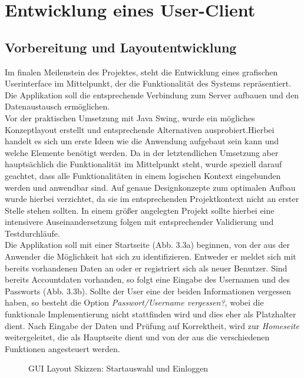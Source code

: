 

\section{Entwicklung eines User-Client}

\subsection{Vorbereitung und Layoutentwicklung}
Im finalen Meilenstein des Projektes, steht die Entwicklung eines grafischen Userinterface im Mittelpunkt, der die Funktionalität des Systems repräsentiert. Die Applikation soll die entsprechende Verbindung zum Server aufbauen und den Datenaustausch ermöglichen. \\

Vor der praktischen Umsetzung mit Java Swing, wurde ein mögliches Konzeptlayout erstellt und entsprechende Alternativen ausprobiert.Hierbei handelt es sich um erste Ideen wie die Anwendung aufgebaut sein kann und welche Elemente benötigt werden.
Da in der letztendlichen Umsetzung aber hauptsächlich die Funktionalität im Mittelpunkt steht, wurde speziell darauf geachtet, dass alle Funktionalitäten in einem logischen Kontext eingebunden werden und anwendbar sind. Auf genaue Designkonzepte zum optimalen Aufbau wurde hierbei verzichtet, da sie im entsprechenden Projektkontext nicht an erster Stelle stehen sollten. In einem größer angelegten Projekt sollte hierbei eine intensivere Auseinandersetzung folgen mit entsprechender Validierung und Testdurchläufe. \\

Die Applikation soll mit einer Startseite (Abb. 3.3a) beginnen, von der aus der Anwender die Möglichkeit hat sich zu identifizieren. Entweder er meldet sich mit bereits vorhandenen Daten an oder er registriert sich als neuer Benutzer.
Sind bereits Accountdaten vorhanden, so folgt eine Eingabe des Usernamen und des Passworts (Abb. 3.3b). Sollte der User eine der beiden Informationen vergessen haben, so besteht die Option \textit{Passwort/Username vergessen?}, wobei die funktionale Implementierung nicht stattfinden wird und dies eher als Platzhalter dient. Nach Eingabe der Daten und Prüfung auf Korrektheit, wird zur \textit{Homeseite} weitergeleitet, die als Hauptseite dient und von der aus die verschiedenen Funktionen angesteuert werden.

\begin{figure}[h!]
\centering
\hfill %
\hfill %
\hfill %
\caption{GUI Layout Skizzen: Startauswahl und Einloggen }
\label{gui-skizzen-start-login}
\end{figure}




